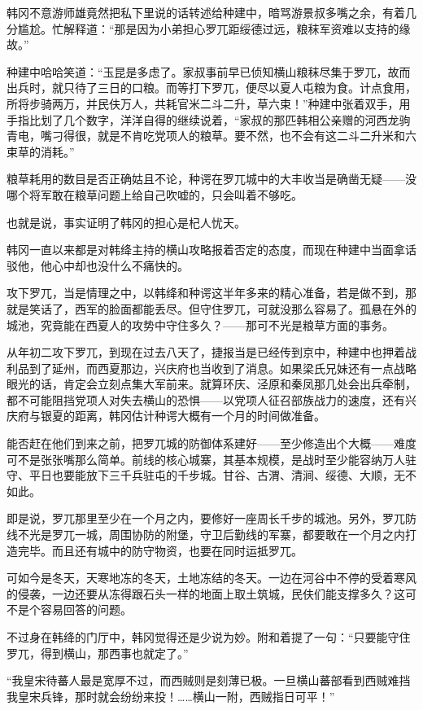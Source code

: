 韩冈不意游师雄竟然把私下里说的话转述给种建中，暗骂游景叔多嘴之余，有着几分尴尬。忙解释道：“那是因为小弟担心罗兀距绥德过远，粮秣军资难以支持的缘故。”

种建中哈哈笑道：“玉昆是多虑了。家叔事前早已侦知横山粮秣尽集于罗兀，故而出兵时，就只待了三日的口粮。而等打下罗兀，便尽以夏人屯粮为食。计点食用，所将步骑两万，并民伕万人，共耗官米二斗二升，草六束！”种建中张着双手，用手指比划了几个数字，洋洋自得的继续说着，“家叔的那匹韩相公亲赠的河西龙驹青电，嘴刁得很，就是不肯吃党项人的粮草。要不然，也不会有这二斗二升米和六束草的消耗。”

粮草耗用的数目是否正确姑且不论，种谔在罗兀城中的大丰收当是确凿无疑——没哪个将军敢在粮草问题上给自己吹嘘的，只会叫着不够吃。

也就是说，事实证明了韩冈的担心是杞人忧天。

韩冈一直以来都是对韩绛主持的横山攻略报着否定的态度，而现在种建中当面拿话驳他，他心中却也没什么不痛快的。

攻下罗兀，当是情理之中，以韩绛和种谔这半年多来的精心准备，若是做不到，那就是笑话了，西军的脸面都能丢尽。但守住罗兀，可就没那么容易了。孤悬在外的城池，究竟能在西夏人的攻势中守住多久？——那可不光是粮草方面的事务。

从年初二攻下罗兀，到现在过去八天了，捷报当是已经传到京中，种建中也押着战利品到了延州，而西夏那边，兴庆府也当收到了消息。如果梁氏兄妹还有一点战略眼光的话，肯定会立刻点集大军前来。就算环庆、泾原和秦凤那几处会出兵牵制，都不可能阻挡党项人对失去横山的恐惧——以党项人征召部族战力的速度，还有兴庆府与银夏的距离，韩冈估计种谔大概有一个月的时间做准备。

能否赶在他们到来之前，把罗兀城的防御体系建好——至少修造出个大概——难度可不是张张嘴那么简单。前线的核心城寨，其基本规模，是战时至少能容纳万人驻守、平日也要能放下三千兵驻屯的千步城。甘谷、古渭、清涧、绥德、大顺，无不如此。

即是说，罗兀那里至少在一个月之内，要修好一座周长千步的城池。另外，罗兀防线不光是罗兀一城，周围协防的附堡，守卫后勤线的军寨，都要敢在一个月之内打造完毕。而且还有城中的防守物资，也要在同时运抵罗兀。

可如今是冬天，天寒地冻的冬天，土地冻结的冬天。一边在河谷中不停的受着寒风的侵袭，一边还要从冻得跟石头一样的地面上取土筑城，民伕们能支撑多久？这可不是个容易回答的问题。

不过身在韩绛的门厅中，韩冈觉得还是少说为妙。附和着提了一句：“只要能守住罗兀，得到横山，那西事也就定了。”

“我皇宋待蕃人最是宽厚不过，而西贼则是刻薄已极。一旦横山蕃部看到西贼难挡我皇宋兵锋，那时就会纷纷来投！……横山一附，西贼指日可平！”

